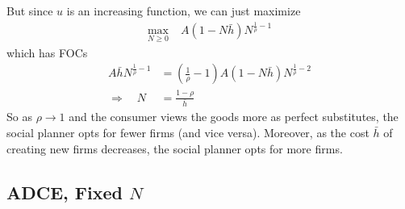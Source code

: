 \documentclass[12pt]{article}
\theoremstyle{plain}
\theoremstyle{definition}
\theoremstyle{remark}
\newcommand{\ra}{\rightarrow}
\begin{document}
But since $u$ is an increasing function, we can just maximize
\begin{align*}
  \max_{N\geq 0}
    & \;
      A(1-N\bar{h})
      N^{\frac{1}{\rho}-1}
\end{align*}
which has FOCs
\begin{align*}
  A\bar{h} N^{\frac{1}{\rho}-1}
  &=
  \left(\frac{1}{\rho}-1\right)
  A(1-N\bar{h}) N^{\frac{1}{\rho}-2} \\
  \Rightarrow\quad
  N &= \frac{1-\rho}{\bar{h}}
\end{align*}
So as $\rho\ra 1$ and the consumer views the goods more as perfect
substitutes, the social planner opts for fewer firms (and vice versa).
Moreover, as the cost $\bar{h}$ of creating new firms decreases, the
social planner opts for more firms.


\clearpage
\subsection{ADCE, Fixed $N$}
\end{document}
